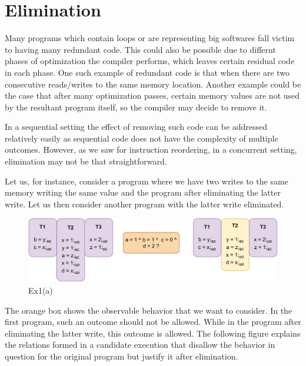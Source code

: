 \section{Elimination}

    Many programs which contain loops or are representing big softwares fall victim to having many redundant code. 
    This could also be possible due to differnt phases of optimization the compiler performs, which leaves certain residual code in each phase.
    One such example of redundant code is that when there are two consecutive reads/writes to the same memory location.
    Another example could be the case that after many optimization passes, certain memory values are not used by the resultant program itself, so the compiler may decide to remove it.
    

    In a sequential setting the effect of removing such code can be addressed relatively easily as sequential code does not have the complexity of multiple outcomes.
    However, as we saw for instruction reordering, in a concurrent setting, elimination may not be that straightforward. 
    
    Let us, for instance, consider a program where we have two writes to the same memory writing the same value and the program after eliminating the latter write. Let us then consider another program with the latter write eliminated.  

    \begin{figure}[H]
        \centering
        \includegraphics[scale=0.7]{6.Elimination/EliminationExample1(a).pdf}
        \caption{Ex1(a)} 
    \end{figure}

    The orange box shows the observable behavior that we want to consider. 
    In the first program, such an outcome should not be allowed. 
    While in the program after eliminating the latter write, this outcome is allowed.
    The following figure explains the relations formed in a candidate execution that disallow the behavior in question for the original program but justify it after elimination. 
    
